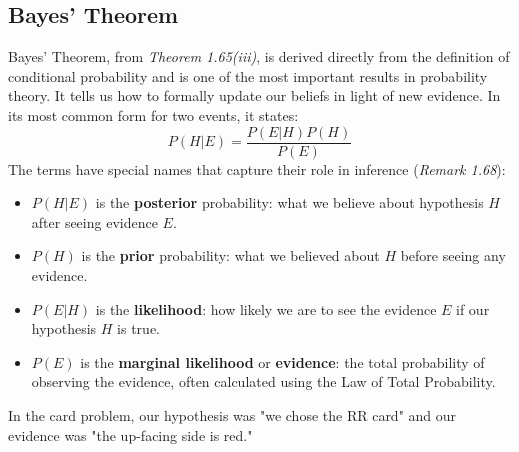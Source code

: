 \documentclass[11pt,a4paper]{article}
\theoremstyle{tutorstyle}
\begin{document}
\subsection{Bayes' Theorem}\label{concept_bayes}
Bayes' Theorem, from \textit{Theorem 1.65(iii)}, is derived directly from the definition of conditional probability and is one of the most important results in probability theory. It tells us how to formally update our beliefs in light of new evidence. In its most common form for two events, it states:
\[
P(H | E) = \frac{P(E | H) P(H)}{P(E)}
\]
The terms have special names that capture their role in inference (\textit{Remark 1.68}):
\begin{itemize}
    \item $P(H | E)$ is the \textbf{posterior} probability: what we believe about hypothesis $H$ after seeing evidence $E$.
    \item $P(H)$ is the \textbf{prior} probability: what we believed about $H$ before seeing any evidence.
    \item $P(E | H)$ is the \textbf{likelihood}: how likely we are to see the evidence $E$ if our hypothesis $H$ is true.
    \item $P(E)$ is the \textbf{marginal likelihood} or \textbf{evidence}: the total probability of observing the evidence, often calculated using the Law of Total Probability.
\end{itemize}
In the card problem, our hypothesis was "we chose the RR card" and our evidence was "the up-facing side is red."
\end{document}
